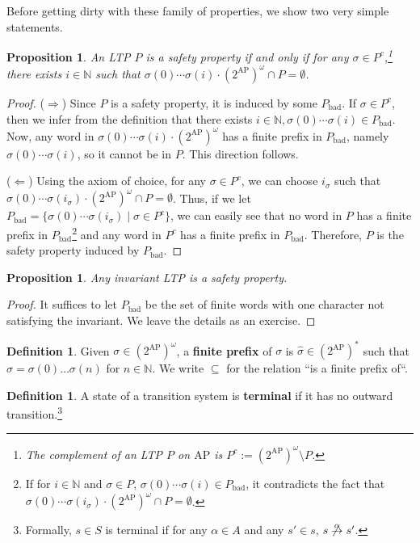 \documentclass{tufte-handout} %
\newtheorem{prop}[thm]{Proposition}
\theoremstyle{definition}
\newtheorem{defn}[thm]{Definition}
\theoremstyle{remark}
\newcommand{\N}{\mathbb{N}}
\newcommand{\0}{\textsf{0}}
\newcommand{\1}{\textsf{1}}
\newcommand{\AP}{\text{AP}}
\newcommand{\action}[1]{\stackrel{#1}{\rightarrow}}
\begin{document}
Before getting dirty with these family of properties, we show two very simple statements.
\begin{prop}\label{prop-equivdefsafe}
	An LTP $P$ is a safety property if and only if for any $\sigma \in P^{c}$,\footnote{The complement of an LTP $P$ on $\AP$ is $P^c := (2^{\AP})^{\omega} \setminus P$.} there exists $i \in \N$ such that $\sigma(0)\cdots\sigma(i)\cdot (2^{\AP})^{\omega} \cap P = \emptyset$.
\end{prop}
\begin{proof}
	($\Rightarrow$) Since $P$ is a safety property, it is induced by some $P_{\text{bad}}$. If $\sigma \in P^c$, then we infer from the definition that there exists $i\in \N, \sigma(0)\cdots\sigma(i)\in P_{\text{bad}}$. Now, any word in $\sigma(0)\cdots\sigma(i)\cdot (2^{\AP})^{\omega}$ has a finite prefix in $P_{\text{bad}}$, namely $\sigma(0)\cdots\sigma(i)$, so it cannot be in $P$. This direction follows.
	
	($\Leftarrow$) Using the axiom of choice, for any $\sigma \in P^c$, we can choose $i_{\sigma}$ such that $\sigma(0)\cdots\sigma(i_{\sigma})\cdot (2^{\AP})^{\omega} \cap P = \emptyset$. Thus, if we let $P_{\text{bad}} = \{\sigma(0)\cdots\sigma(i_{\sigma}) \mid \sigma \in P^c\}$, we can easily see that no word in $P$ has a finite prefix in $P_{\text{bad}}$\footnote{If for $i \in \N$ and $\sigma \in P$, $\sigma(0)\cdots \sigma(i) \in P_{\text{bad}}$, it contradicts the fact that $\sigma(0)\cdots\sigma(i_{\sigma})\cdot (2^{\AP})^{\omega} \cap P = \emptyset$.} and any word in $P^c$ has a finite prefix in $P_{\text{bad}}$. Therefore, $P$ is the safety property induced by $P_{\text{bad}}$. 
\end{proof}
\begin{prop}
	Any invariant LTP is a safety property.	
\end{prop}
\begin{proof}
	It suffices to let $P_{\text{bad}}$ be the set of finite words with one character not satisfying the invariant. We leave the details as an exercise.
\end{proof}
\begin{defn}
	Given $\sigma \in (2^{\AP})^{\omega}$, a \textbf{finite prefix} of $\sigma$ is $\hat{\sigma} \in (2^{\AP})^*$ such that $\hat{\sigma} = \sigma(0)\dots\sigma(n)$ for $n \in\N$.	We write $\subseteq$ for the relation ``is a finite prefix of``. 
\end{defn}
\begin{defn}
	A state of a transition system is \textbf{terminal} if it has no outward transition.\footnote{Formally, $s \in S$ is terminal if for any $\alpha \in A$ and any $s' \in s$, $s \not\action{\alpha} s'$.}
\end{defn}
\end{document}
